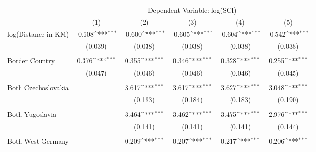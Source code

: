 {
\def\sym#1{\ifmmode^{#1}\else\(^{#1}\)\fi}
\begin{tabular}{l*{5}{c}}
\hline\hline
            &\multicolumn{5}{c}{Dependent Variable: log(SCI)}         &                     &                     &                     &                     \\
            &\multicolumn{1}{c}{(1)}         &\multicolumn{1}{c}{(2)}         &\multicolumn{1}{c}{(3)}         &\multicolumn{1}{c}{(4)}         &\multicolumn{1}{c}{(5)}         \\
\hline
log(Distance in KM)&      -0.608\sym{***}&      -0.600\sym{***}&      -0.605\sym{***}&      -0.604\sym{***}&      -0.542\sym{***}\\
            &     (0.039)         &     (0.038)         &     (0.038)         &     (0.038)         &     (0.038)         \\
            &                     &                     &                     &                     &                     \\
Border Country&       0.376\sym{***}&       0.355\sym{***}&       0.346\sym{***}&       0.328\sym{***}&       0.255\sym{***}\\
            &     (0.047)         &     (0.046)         &     (0.046)         &     (0.046)         &     (0.045)         \\
            &                     &                     &                     &                     &                     \\
Both Czechoslovakia&                     &       3.617\sym{***}&       3.617\sym{***}&       3.627\sym{***}&       3.048\sym{***}\\
            &                     &     (0.183)         &     (0.184)         &     (0.183)         &     (0.190)         \\
            &                     &                     &                     &                     &                     \\
Both Yugoslavia&                     &       3.464\sym{***}&       3.462\sym{***}&       3.475\sym{***}&       2.976\sym{***}\\
            &                     &     (0.141)         &     (0.141)         &     (0.141)         &     (0.144)         \\
            &                     &                     &                     &                     &                     \\
Both West Germany&                     &       0.209\sym{***}&       0.207\sym{***}&       0.217\sym{***}&       0.206\sym{***}\\

\end{tabular}}
